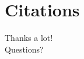 \documentclass[11pt]{beamer} %
\begin{document}
\section{Citations}





\begin{frame} \vspace{\fill} \begin{center} \Huge 
Thanks a lot!\\ \vspace{\fill} Questions? 
\end{center} \vspace{\fill} \end{frame} 
\end{document}
